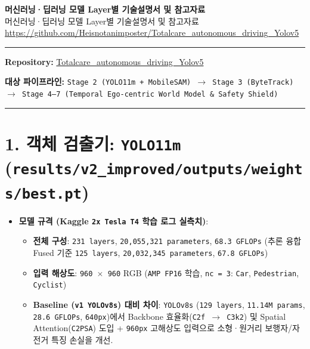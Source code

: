 \documentclass[10.5pt,a4paper]{article}
\begin{document}
\begin{center}
{\LARGE\bfseries 머신러닝·딥러닝 모델 Layer별 기술설명서 및 참고자료}\\[6pt]
{\normalsize\color{gray} 머신러닝·딥러닝 모델 Layer별 기술설명서 및 참고자료}\\[4pt]
{\small\href{https://github.com/Heisnotanimposter/Totalcare_autonomous_driving_Yolov5}{https://github.com/Heisnotanimposter/Totalcare\_autonomous\_driving\_Yolov5}}
\end{center}
\vspace{4pt}
\hrule
\vspace{8pt}

\textbf{Repository:} \href{https://github.com/Heisnotanimposter/Totalcare\_autonomous\_driving\_Yolov5}{Totalcare\_autonomous\_driving\_Yolov5}

\textbf{대상 파이프라인:} \texttt{Stage 2 (YOLO11m + MobileSAM) $\rightarrow$ Stage 3 (ByteTrack) $\rightarrow$ Stage 4--7 (Temporal Ego-\allowbreak{}centric World Model \& Safety Shield)}


\par\noindent\rule{\textwidth}{0.4pt}\par\medskip

\section{1. 객체 검출기: \texttt{YOLO11m} (\texttt{results/\allowbreak{}v2\_\allowbreak{}improved/\allowbreak{}outputs/\allowbreak{}weights/\allowbreak{}best.\allowbreak{}pt})}

\begin{itemize}[leftmargin=1.5em,itemsep=2pt]
\item \textbf{모델 규격 (Kaggle \texttt{2x Tesla T4} 학습 로그 실측치)}:
\begin{itemize}[leftmargin=1.5em,itemsep=2pt]
\item \textbf{전체 구성}: \texttt{231 layers}, \texttt{20,\allowbreak{}055,\allowbreak{}321 parameters}, \texttt{68.\allowbreak{}3 GFLOPs} (추론 융합 Fused 기준 \texttt{125 layers}, \texttt{20,\allowbreak{}032,\allowbreak{}345 parameters}, \texttt{67.\allowbreak{}8 GFLOPs})
\item \textbf{입력 해상도}: \texttt{960 $\times$ 960} RGB (\texttt{AMP FP16} 학습, \texttt{nc = 3}: \texttt{Car}, \texttt{Pedestrian}, \texttt{Cyclist})
\item \textbf{Baseline (\texttt{v1 YOLOv8s}) 대비 차이}: \texttt{YOLOv8s} (\texttt{129 layers}, \texttt{11.\allowbreak{}14M params}, \texttt{28.\allowbreak{}6 GFLOPs}, \texttt{640px})에서 Backbone 효율화(\texttt{C2f $\rightarrow$ C3k2}) 및 Spatial Attention(\texttt{C2PSA}) 도입 + \texttt{960px} 고해상도 입력으로 소형·원거리 보행자/자전거 특징 손실을 개선.
\end{itemize}
\end{itemize}
\end{document}
